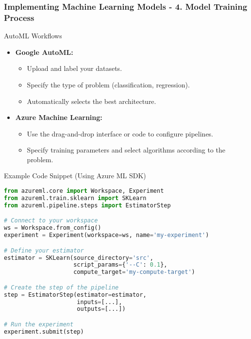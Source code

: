 \documentclass[aspectratio=169]{beamer}
\begin{document}
\begin{frame}[fragile]
    \frametitle{Implementing Machine Learning Models - 4. Model Training Process}
    \begin{block}{AutoML Workflows}
        \begin{itemize}
            \item \textbf{Google AutoML:}
                \begin{itemize}
                    \item Upload and label your datasets.
                    \item Specify the type of problem (classification, regression).
                    \item Automatically selects the best architecture.
                \end{itemize}
            \item \textbf{Azure Machine Learning:}
                \begin{itemize}
                    \item Use the drag-and-drop interface or code to configure pipelines.
                    \item Specify training parameters and select algorithms according to the problem.
                \end{itemize}
        \end{itemize}
    \end{block}
    
    \begin{block}{Example Code Snippet (Using Azure ML SDK)}
    \begin{lstlisting}[language=Python]
from azureml.core import Workspace, Experiment
from azureml.train.sklearn import SKLearn
from azureml.pipeline.steps import EstimatorStep

# Connect to your workspace
ws = Workspace.from_config()
experiment = Experiment(workspace=ws, name='my-experiment')

# Define your estimator
estimator = SKLearn(source_directory='src', 
                    script_params={'--C': 0.1},
                    compute_target='my-compute-target')

# Create the step of the pipeline
step = EstimatorStep(estimator=estimator, 
                     inputs=[...],
                     outputs=[...])

# Run the experiment
experiment.submit(step)
    \end{lstlisting}
    \end{block}
\end{frame}
\end{document}
